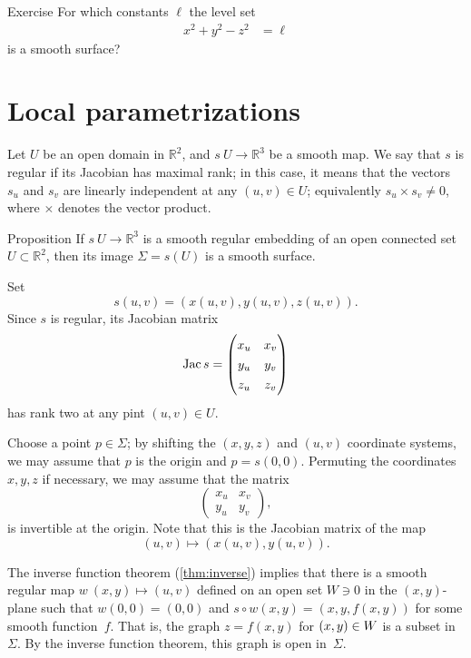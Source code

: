 \begin{thm}{Exercise}\label{ex:hyperboloids}
For which constants $\ell$ 
the level set
\begin{align*}
x^2+y^2-z^2&=\ell
\end{align*}
is a smooth surface?
\end{thm}

\section{Local parametrizations}

Let $U$ be an open domain in $\mathbb{R}^2$, and $s\:U\to \mathbb{R}^3$ be a smooth map.
We say that $s$ is regular if its Jacobian has maximal rank;
in this case, it means that the vectors $s_u$ and $s_v$ are linearly independent at any $(u,v)\in U$;
equivalently $s_u\times s_v\ne 0$, where $\times$ denotes the vector product.

\begin{thm}{Proposition}\label{prop:graph-chart}
If $s\:U\to \mathbb{R}^3$ is a smooth regular embedding of an open connected set $U\subset \mathbb{R}^2$, then its image $\Sigma=s(U)$ is a smooth surface.
\end{thm}

Set 
\[s(u,v)=(x(u,v),y(u,v),z(u,v)).\]
Since $s$ is regular, its Jacobian matrix
\[\Jac s=
\renewcommand\arraystretch{1.3}
\begin{pmatrix}
x_u&x_v\\
y_u&y_v\\
z_u&z_v
\end{pmatrix}
\]
has rank two at any pint $(u,v)\in U$.

Choose a point $p\in \Sigma$; by shifting the $(x,y,z)$ and $(u,v)$ coordinate systems, we may assume that $p$ is the origin and $p=s(0,0)$.
Permuting the coordinates $x,y,z$ if necessary, we may assume that 
the matrix 
\[
\renewcommand\arraystretch{1.3}
\begin{pmatrix}
x_u&x_v\\
y_u&y_v
\end{pmatrix},
\] 
is invertible at the origin.
Note that this is the Jacobian matrix of the map
\[(u,v)\mapsto (x(u,v),y(u,v)).\]

The inverse function theorem (\ref{thm:inverse}) implies that there is a smooth regular map
$w\:(x,y)\mapsto (u,v)$ defined on an open set $W\ni 0$ in the $(x,y)$-plane
such that $w(0,0)=(0,0)$ and  $s\circ w(x,y)=(x,y,f(x,y))$ for some smooth function~$f$.
That is, the graph $z=f(x,y)$ for $(x,y)\z\in W$ is a subset in~$\Sigma$.
By the inverse function theorem, this graph is open in~$\Sigma$.

